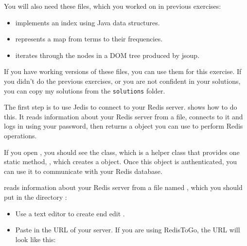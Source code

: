 \documentclass[12pt]{book}
\theoremstyle{exercise}
\begin{document}
You will also need these files, which you worked on in previous
exercises:

\begin{itemize}

\item
   implements an index using Java data structures.

\item
   represents a map from terms to their
  frequencies.

\item
   iterates through the nodes in a DOM
  tree produced by jsoup.

\end{itemize}

If you have working versions of these files, you can use them for
this exercise.  If you didn't do the previous exercises, or you
are not confident in your solutions, you can copy my solutions
from the {\tt solutions} folder.

The first step is to use Jedis to connect to your Redis server.
 shows how to do this. It reads information
about your Redis server from a file, connects to it and logs in using
your password, then returns a  object you can use to
perform Redis operations.


If you open , you should see the
 class, which is a helper class that provides one
static method, , which creates a  object. Once
this object is authenticated, you can use it to communicate with your
Redis database.

 reads information about your Redis server from a
file named , which you should put in the
directory :

\begin{itemize}

\item
  Use a text editor to create end edit
  .

\item
  Paste in the URL of your server. If you are using RedisToGo, the URL
  will look like this:


\end{itemize}
\end{document}
